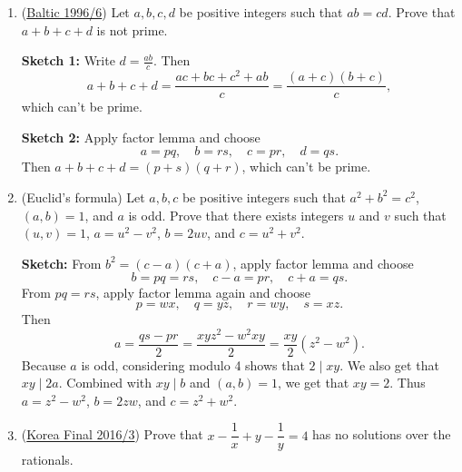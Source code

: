 \documentclass[11pt,paper=letter]{scrartcl}
\begin{document}
\begin{enumerate}

\item (\href{https://artofproblemsolving.com/community/c6h220674p1223920}{Baltic 1996/6}) Let $a,b,c, d$ be positive integers such that $ab=cd$. Prove that $a+b+c+d$ is not prime.

\textbf{Sketch 1:} Write $d = \frac{ab}{c}$. Then \[
  a + b + c + d = \frac{ac + bc + c^2 + ab}{c} = \frac{(a + c)(b + c)}{c},
\]
which can't be prime.

\textbf{Sketch 2:} Apply factor lemma and choose \[
  a = pq, \quad b = rs, \quad c = pr, \quad d = qs.
\]
Then $a + b + c + d = (p + s)(q + r)$, which can't be prime.

\item (Euclid's formula) Let $a,b,c$ be positive integers such that $a^2 + b^2 = c^2$, $(a, b) = 1$, and $a$ is odd. Prove that there exists integers $u$ and $v$ such that $(u, v) = 1$, $a = u^2 - v^2$, $b = 2uv$, and $c = u^2 + v^2$.

\textbf{Sketch:} From $b^2 = (c - a)(c + a)$, apply factor lemma and choose \[
  b = pq = rs, \quad c - a = pr, \quad c + a = qs.
\]
From $pq = rs$, apply factor lemma again and choose \[
  p = wx, \quad q = yz, \quad r = wy, \quad s = xz.
\]
Then \[
  a = \frac{qs - pr}{2} = \frac{xyz^2 - w^2xy}{2} = \frac{xy}{2}\left(z^2 - w^2\right).
\]
Because $a$ is odd, considering modulo 4 shows that $2 \mid xy$. We also get that $xy \mid 2a$. Combined with $xy \mid b$ and $(a, b) = 1$, we get that $xy = 2$. Thus $a = z^2 - w^2$, $b = 2zw$, and $c = z^2 + w^2$.

\item (\href{https://artofproblemsolving.com/community/c6h1214200p6032947}{Korea Final 2016/3}) Prove that $x-\dfrac{1}{x}+y-\dfrac{1}{y}=4$ has no solutions over the rationals.


\end{enumerate}
\end{document}
